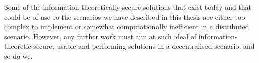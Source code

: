 Some of the information-theoretically secure solutions that exist today and that 
could be of use to the scenarios we have described in this thesis are either too 
complex to implement or somewhat computationally inefficient in a distributed scenario. 
However, any further work must aim at such ideal of information-theoretic secure, 
usable and performing solutions in a decentralised scenario, and so do we.

